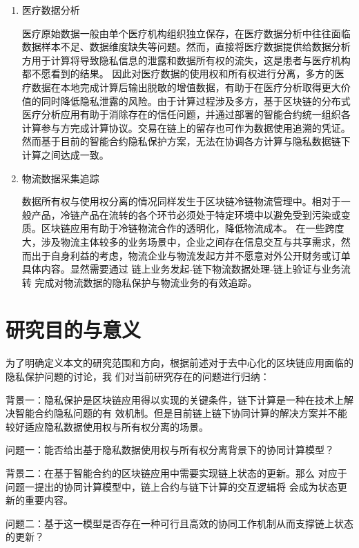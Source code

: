 \begin{enumerate}

\item 医疗数据分析

医疗原始数据一般由单个医疗机构组织独立保存，在医疗数据分析中往往面临数据样本不足、数据维度缺失等问题。然而，直接将医疗数据提供给数据分析方用于计算将导致隐私信息的泄露和数据所有权的流失，这是患者与医疗机构都不愿看到的结果。
因此对医疗数据的使用权和所有权进行分离，多方的医疗数据在本地完成计算后输出脱敏的增值数据，有助于在医疗分析取得更大价值的同时降低隐私泄露的风险。由于计算过程涉及多方，基于区块链的分布式医疗分析应用有助于消除存在的信任问题，并通过部署的智能合约统一组织各计算参与方完成计算协议。交易在链上的留存也可作为数据使用追溯的凭证。然而基于目前的智能合约隐私保护方案，无法在协调各方计算与隐私数据链下计算之间达成一致。
    
\item 物流数据采集追踪

数据所有权与使用权分离的情况同样发生于区块链冷链物流管理中。相对于一般产品，冷链产品在流转的各个环节必须处于特定环境中以避免受到污染或变质。区块链应用有助于冷链物流合作的透明化，降低物流成本。
在一些跨度大，涉及物流主体较多的业务场景中，企业之间存在信息交互与共享需求，然而出于自身利益的考虑，物流企业与物流发起方并不愿意对外公开财务或订单具体内容。显然需要通过 链上业务发起-链下物流数据处理-链上验证与业务流转 完成对物流数据的隐私保护与物流业务的有效追踪。

\end{enumerate}

\section{研究目的与意义}

为了明确定义本文的研究范围和方向，根据前述对于去中心化的区块链应用面临的隐私保护问题的讨论，我
们对当前研究存在的问题进行归纳：

背景一：隐私保护是区块链应用得以实现的关键条件，链下计算是一种在技术上解决智能合约隐私问题的有
效机制。但是目前链上链下协同计算的解决方案并不能较好适应隐私数据使用权与所有权分离的场景。

问题一：能否给出基于隐私数据使用权与所有权分离背景下的协同计算模型？

背景二：在基于智能合约的区块链应用中需要实现链上状态的更新。那么
对应于问题一提出的协同计算模型中，链上合约与链下计算的交互逻辑将
会成为状态更新的重要内容。

问题二：基于这一模型是否存在一种可行且高效的协同工作机制从而支撑链上状态的更新？

